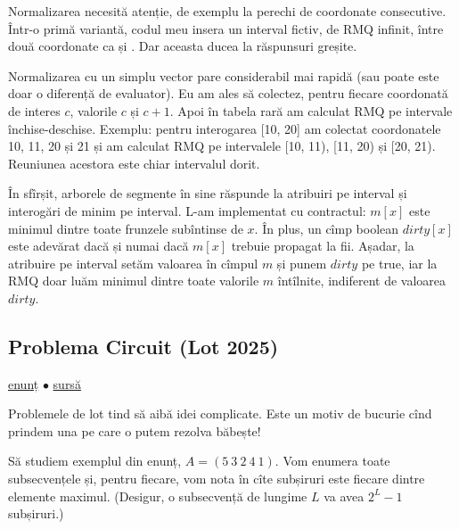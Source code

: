 Normalizarea necesită atenție, de exemplu la perechi de coordonate consecutive. Într-o primă variantă, codul meu insera un interval fictiv, de RMQ infinit, între două coordonate ca  și . Dar aceasta ducea la răspunsuri greșite.

Normalizarea cu un simplu vector pare considerabil mai rapidă (sau poate este doar o diferență de evaluator). Eu am ales să colectez, pentru fiecare coordonată de interes $c$, valorile $c$ și $c+1$. Apoi în tabela rară am calculat RMQ pe intervale închise-deschise. Exemplu: pentru interogarea [10, 20] am colectat coordonatele 10, 11, 20 și 21 și am calculat RMQ pe intervalele [10, 11), [11, 20) și [20, 21). Reuniunea acestora este chiar intervalul dorit.

În sfîrșit, arborele de segmente în sine răspunde la atribuiri pe interval și interogări de minim pe interval. L-am implementat cu contractul: $m[x]$ este minimul dintre toate frunzele subîntinse de $x$. În plus, un cîmp boolean $dirty[x]$ este adevărat dacă și numai dacă $m[x]$ trebuie propagat la fii. Așadar, la atribuire pe interval setăm valoarea în cîmpul $m$ și punem $dirty$ pe true, iar la RMQ doar luăm minimul dintre toate valorile $m$ întîlnite, indiferent de valoarea $dirty$.

\subsection{Problema Circuit (Lot 2025)}
\label{problem:circuit}

\href{https://kilonova.ro/problems/3806}{enunț}
$\bullet$
\hyperref[code:circuit]{sursă}

Problemele de lot tind să aibă idei complicate. Este un motiv de bucurie cînd prindem una pe care o putem rezolva băbește!

Să studiem exemplul din enunț, $A = (5\ 3\ 2\ 4\ 1)$. Vom enumera toate subsecvențele și, pentru fiecare, vom nota în cîte subșiruri este fiecare dintre elemente maximul. (Desigur, o subsecvență de lungime $L$ va avea $2^L - 1$ subșiruri.)

